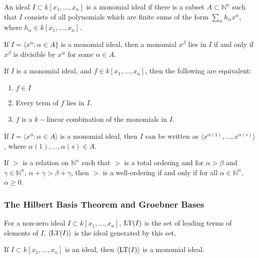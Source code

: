 \documentclass[../main.tex]{subfiles}
\begin{document}
%
\begin{definition}
An ideal $I\subset k[x_1,\hdots ,x_n]$ is a monomial ideal if there is a subset $A\subset \mathbb{N}^n$ such that $I$ consists of all polynomials which are finite sums of the form $\sum_{\alpha} h_{\alpha} x^\alpha$, where $h_{\alpha} \in k[x_1,\hdots ,x_n]$. 
\end{definition}
%
\begin{theorem}
If $I=\langle x^\alpha: \alpha \in A\}$ is a monomial ideal, then a monomial $x^\beta$ lies in $I$ if and only if $x^\beta$ is divisible by $x^\alpha$ for some $\alpha \in A$.
\end{theorem}
%
\begin{theorem}
If $I$ is a monomial ideal, and $f\in k[x_1,\hdots ,x_n]$, then the following are equivalent:
\begin{enumerate}
\item $f\in I$
\item Every term of $f$ lies in $I$.
\item $f$ is a $k-$linear combination of the monomials in $I$.
\end{enumerate}
\end{theorem}
%
\begin{theorem}
If $I=\langle x^\alpha: \alpha \in A\rangle$ is a monomial ideal, then $I$ can be written as $\langle x^{\alpha(1)}, \hdots, x^{\alpha(s)}\rangle$, where $\alpha(1),\hdots, \alpha(s) \in A$. 
\end{theorem}
%
\begin{theorem}
If $>$ is a relation on $\mathbb{N}^n$ such that $>$ is a total ordering and for $\alpha>\beta$ and $\gamma\in \mathbb{N}^n$, $\alpha+\gamma>\beta+\gamma$, then $>$ is a well-ordering if and only if for all $\alpha \in \mathbb{N}^n$, $\alpha \geq 0$.
\end{theorem}
%
\subsubsection{The Hilbert Basis Theorem and Groebner Bases}
%
\begin{definition}
For a non-zero ideal $I\subset k[x_1,\hdots ,x_n]$, $\operatorname{LT}(I)$ is the set of leading terms of elements of $I$. $\langle \operatorname{LT}(I)\rangle$ is the ideal generated by this set.
\end{definition}

\begin{theorem}
If $I\subset k[x_1,\hdots ,x_n]$ is an ideal, then $\langle \operatorname{LT}(I)\rangle$ is a monomial ideal.
\end{theorem}
\end{document}
